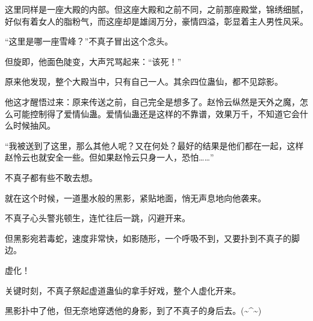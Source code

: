 \begin{this_body}
这里同样是一座大殿的内部。但这座大殿和之前不同，之前那座殿堂，锦绣细腻，好似有着女人的脂粉气，而这座却是雄阔万分，豪情四溢，彰显着主人男性风采。

“这里是哪一座雪峰？”不真子冒出这个念头。

但旋即，他面色陡变，大声咒骂起来：“该死！”

原来他发现，整个大殿当中，只有自己一人。其余四位蛊仙，都不见踪影。

他这才醒悟过来：原来传送之前，自己完全是想多了。赵怜云纵然是天外之魔，怎么可能控制得了爱情仙蛊。爱情仙蛊还是这样的不靠谱，效果万千，不知道它会什么时候抽风。

“我被送到了这里，那么其他人呢？又在何处？最好的结果是他们都在一起，这样赵怜云也就安全一些。但如果赵怜云只身一人，恐怕……”

不真子都有些不敢去想。

就在这个时候，一道墨水般的黑影，紧贴地面，悄无声息地向他袭来。

不真子心头警兆顿生，连忙往后一跳，闪避开来。

但黑影宛若毒蛇，速度非常快，如影随形，一个呼吸不到，又要扑到不真子的脚边。

虚化！

关键时刻，不真子祭起虚道蛊仙的拿手好戏，整个人虚化开来。

黑影扑中了他，但无奈地穿透他的身影，到了不真子的身后去。(\~{}\^{}\~{})

\end{this_body}

